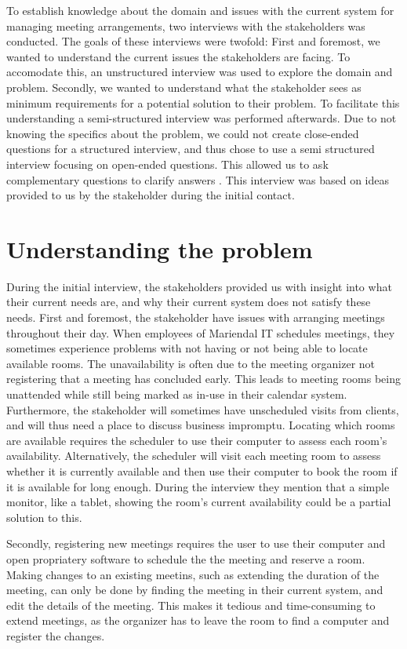 To establish knowledge about the domain and issues with the current system for managing meeting arrangements, two interviews with the stakeholders was conducted.  
The goals of these interviews were twofold: 
First and foremost, we wanted  to understand the current issues the stakeholders are facing. 
To accomodate this, an unstructured interview was used to explore the domain and problem\cite{robson2002real}.
Secondly, we wanted to understand what the stakeholder sees as minimum requirements for a potential solution to their problem. 
To facilitate this understanding a semi-structured interview was performed afterwards. 
Due to not knowing the specifics about the problem, we could not create close-ended questions for a structured interview, and thus chose to use a semi structured interview focusing on open-ended questions. This allowed us to ask complementary questions to clarify answers \cite{InterviewsNHS}.
This interview was based on ideas provided to us by the stakeholder during the initial contact.


\section{Understanding the problem} %
During the initial interview, the stakeholders provided us with insight into what their current needs are, and why their current system does not satisfy these needs.
First and foremost, the stakeholder have issues with arranging meetings throughout their day.
When employees of Mariendal IT schedules meetings, they sometimes experience problems with not having or not being able to locate available rooms.
The unavailability is often due to the meeting organizer not registering that a meeting has concluded early.
This leads to meeting rooms being unattended while still being marked as in-use in their calendar system.
Furthermore, the stakeholder will sometimes have unscheduled visits from clients, and will thus need a place to discuss business impromptu. 
Locating which rooms are available requires the scheduler to use their computer to assess each room's availability.
Alternatively, the scheduler will visit each meeting room to assess whether it is currently available and then use their computer to book the room if it is available for long enough.
During the interview they mention that a simple monitor, like a tablet, showing the room's current availability could be a partial solution to this.

Secondly, registering new meetings requires the user to use their computer and open propriatery software to schedule the the meeting and reserve a room.
Making changes to an existing meetins, such as extending the duration of the meeting, can only be done by finding the meeting in their current system, and edit the details of the meeting.
This makes it tedious and time-consuming to extend meetings, as the organizer has to leave the room to find a computer and register the changes.


